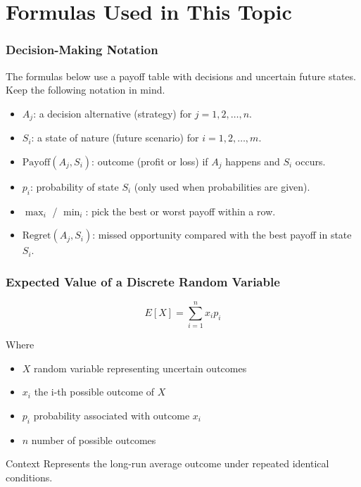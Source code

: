 \chapter{Formulas Used in This Topic}\label{formulas-section}

\subsection{Decision-Making Notation}\label{formula-notation}

The formulas below use a payoff table with decisions and uncertain future states. Keep the following notation in mind.

\begin{itemize}
	\item \(A_j\): a decision alternative (strategy) for \(j = 1, 2, \dots, n\).
	\item \(S_i\): a state of nature (future scenario) for \(i = 1, 2, \dots, m\).
	\item \(\text{Payoff}(A_j,S_i)\): outcome (profit or loss) if \(A_j\) happens and \(S_i\) occurs.
	\item \(p_i\): probability of state \(S_i\) (only used when probabilities are given).
	\item \(\max_i\) / \(\min_i\): pick the best or worst payoff within a row.
	\item \(\text{Regret}(A_j,S_i)\): missed opportunity compared with the best payoff in state \(S_i\).
\end{itemize}
	
	\subsection{Expected Value of a Discrete Random Variable}\label{formula-expected-value}
	
	\[
	E[X] = \sum_{i=1}^{n} x_i p_i
	\]
	
	Where
	\begin{itemize}
		\item \(X\) random variable representing uncertain outcomes
		\item \(x_i\) the i-th possible outcome of \(X\)
		\item \(p_i\) probability associated with outcome \(x_i\)
		\item \(n\) number of possible outcomes
	\end{itemize}
	
	Context
	Represents the long-run average outcome under repeated identical conditions.
	

